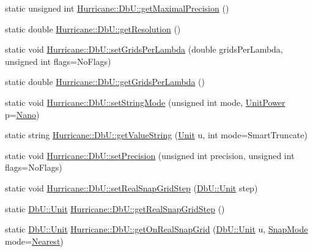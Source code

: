 \begin{DoxyCompactItemize}
static unsigned int \hyperlink{group__DbUGroup_ga8756c9f0a32af5f601cd150e73b02c03}{Hurricane\+::\+Db\+U\+::get\+Maximal\+Precision} ()
\item 
static double \hyperlink{group__DbUGroup_ga120a60b09b344d01c583567a1e489d9e}{Hurricane\+::\+Db\+U\+::get\+Resolution} ()
\item 
static void \hyperlink{group__DbUGroup_gac93f9ba2a09105227e34bd05bcb1500c}{Hurricane\+::\+Db\+U\+::set\+Grids\+Per\+Lambda} (double grids\+Per\+Lambda, unsigned int flags=No\+Flags)
\item 
static double \hyperlink{group__DbUGroup_ga9a0359adbfafc356326f5c6adf57ff04}{Hurricane\+::\+Db\+U\+::get\+Grids\+Per\+Lambda} ()
\item 
static void \hyperlink{group__DbUGroup_ga89ab8f8326c54113336086663ecf1d25}{Hurricane\+::\+Db\+U\+::set\+String\+Mode} (unsigned int mode, \hyperlink{group__DbUGroup_ga50b5785bf4d75026c4c112caec3040a7}{Unit\+Power} p=\hyperlink{group__DbUGroup_gga50b5785bf4d75026c4c112caec3040a7a03e5923be5810db830626f2ca26319d6}{Nano})
\item 
static string \hyperlink{group__DbUGroup_gadc9c1a06b4296dbddcf711077113f4bd}{Hurricane\+::\+Db\+U\+::get\+Value\+String} (\hyperlink{group__DbUGroup_ga4fbfa3e8c89347af76c9628ea06c4146}{Unit} u, int mode=Smart\+Truncate)
\item 
static void \hyperlink{group__DbUGroup_gace9a8644e7e80dcaed2a8a95deeb1622}{Hurricane\+::\+Db\+U\+::set\+Precision} (unsigned int precision, unsigned int flags=No\+Flags)
\item 
static void \hyperlink{group__DbUGroup_ga202cc3aa3364c2224647a29dde047fae}{Hurricane\+::\+Db\+U\+::set\+Real\+Snap\+Grid\+Step} (\hyperlink{group__DbUGroup_ga4fbfa3e8c89347af76c9628ea06c4146}{Db\+U\+::\+Unit} step)
\item 
static \hyperlink{group__DbUGroup_ga4fbfa3e8c89347af76c9628ea06c4146}{Db\+U\+::\+Unit} \hyperlink{group__DbUGroup_ga09e46fcca6aaca94851adfa196e10170}{Hurricane\+::\+Db\+U\+::get\+Real\+Snap\+Grid\+Step} ()
\item 
static \hyperlink{group__DbUGroup_ga4fbfa3e8c89347af76c9628ea06c4146}{Db\+U\+::\+Unit} \hyperlink{group__DbUGroup_ga8746e486f153aa37ee469c1604eba5c0}{Hurricane\+::\+Db\+U\+::get\+On\+Real\+Snap\+Grid} (\hyperlink{group__DbUGroup_ga4fbfa3e8c89347af76c9628ea06c4146}{Db\+U\+::\+Unit} u, \hyperlink{group__DbUGroup_ga1082168d6f9956ebba22ab8bbec21637}{Snap\+Mode} mode=\hyperlink{group__DbUGroup_gga1082168d6f9956ebba22ab8bbec21637a65e6f47eb16779b8974a80d6145a2db5}{Nearest})
\item 

\end{DoxyCompactItemize}
